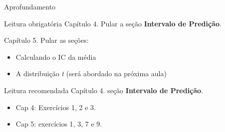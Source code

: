 \documentclass{beamer}
\begin{document}
\begin{frame}{Aprofundamento}
  \begin{block}{Leitura obrigatória}
    Capítulo 4. Pular a seção {\bf Intervalo de Predição}.

    Capítulo 5. Pular as seções:
    \begin{itemize}
    \item Calculando o IC da média
    \item A distribuição {\em t} (será abordado na próxima aula)
    \end{itemize}

  \end{block}
  \begin{block}{Leitura recomendada}
    Capítulo 4. seção {\bf Intervalo de Predição}.
  \end{block}
  \begin{itemize}
  \item Cap 4: Exercícios 1, 2 e 3.
  \item Cap 5: exercícios 1, 3, 7 e 9.
  \end{itemize}
\end{frame}
\end{document}
